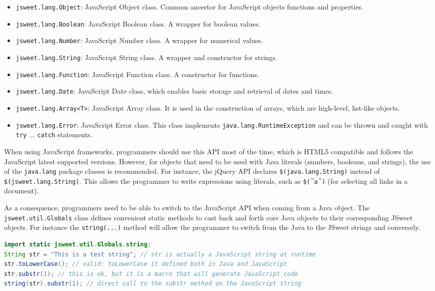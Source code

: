 \documentclass[a4paper]{report}
\begin{document}
\begin{itemize}
\item \texttt{jsweet.lang.Object}: JavaScript Object class. Common ancestor for JavaScript objects functions and properties.
\item \texttt{jsweet.lang.Boolean}: JavaScript Boolean class. A wrapper for boolean values.
\item \texttt{jsweet.lang.Number}: JavaScript Number class. A wrapper for numerical values.
\item \texttt{jsweet.lang.String}: JavaScript String class. A wrapper and constructor for strings.
\item \texttt{jsweet.lang.Function}: JavaScript Function class. A constructor for functions.
\item \texttt{jsweet.lang.Date}: JavaScript Date class, which enables basic storage and retrieval of dates and times.
\item \texttt{jsweet.lang.Array<T>}: JavaScript Array class. It is used in the construction of arrays, which are high-level, list-like objects.
\item \texttt{jsweet.lang.Error}: JavaScript Error class. This class implements \texttt{java.lang.RuntimeException} and can be thrown and caught with \texttt{try} ... \texttt{catch} statements.
\end{itemize}

When using JavaScript frameworks, programmers should use this API most of the time, which is HTML5 compatible and follows the JavaScript latest supported versions. However, for objects that need to be used with Java literals (numbers, booleans, and strings), the use of the \texttt{java.lang} package classes is recommended. For instance, the jQuery API declares \texttt{\$(java.lang.String)} instead of \texttt{\$(jsweet.\-lang.\-String)}. This allows the programmer to write expressions using literals, such as \texttt{\$($"$a$"$)} (for selecting all links in a document).

As a consequence, programmers need to be able to switch to the JavaScript API when coming from a Java object. The \texttt{jsweet.util.Globals} class defines convenient static methods to cast back and forth core Java objects to their corresponding JSweet objects. For instance the \texttt{string(...)} method will allow the programmer to switch from the Java to the JSweet strings and conversely.

\begin{lstlisting}[language=Java]
import static jsweet.util.Globals.string;
String str = "This is a test string"; // str is actually a JavaScript string at runtime
str.toLowerCase(); // valid: toLowerCase it defined both in Java and JavaScript
str.substr(1); // this is ok, but it is a macro that will generate JavaScript code
string(str).substr(1); // direct call to the substr method on the JavaScript string
\end{lstlisting}
\end{document}
